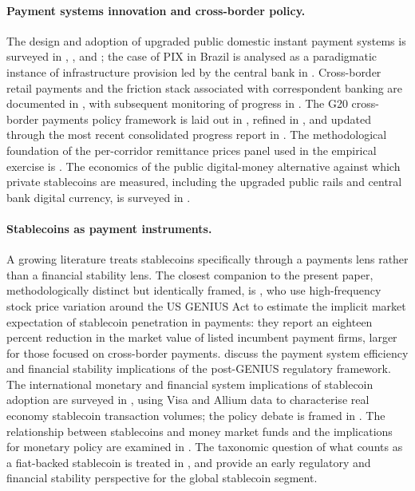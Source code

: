 \paragraph{Payment systems innovation and cross-border policy.} The design and adoption of upgraded public domestic instant payment systems is surveyed in \citet{bech_shimizu_wong_2017}, \citet{boar_etal_2020}, and \citet{frost_etal_2024_fast_payments}; the case of PIX in Brazil is analysed as a paradigmatic instance of infrastructure provision led by the central bank in \citet{duarte_etal_2022_pix}. Cross-border retail payments and the friction stack associated with correspondent banking are documented in \citet{cpmi_2018_cross_border_retail}, with subsequent monitoring of progress in \citet{cpmi_brief10_2024}. The G20 cross-border payments policy framework is laid out in \citet{fsb_2020_roadmap}, refined in \citet{fsb_2023_priority_actions}, and updated through the most recent consolidated progress report in \citet{fsb_2025_progress}. The methodological foundation of the per-corridor remittance prices panel used in the empirical exercise is \citet{beck_martinez_peria_2011}. The economics of the public digital-money alternative against which private stablecoins are measured, including the upgraded public rails and central bank digital currency, is surveyed in \citet{ahnert_etal_2024_economics_cbdc}.

\paragraph{Stablecoins as payment instruments.} A growing literature treats stablecoins specifically through a payments lens rather than a financial stability lens. The closest companion to the present paper, methodologically distinct but identically framed, is \citet{copestake_etal_2026}, who use high-frequency stock price variation around the US GENIUS Act to estimate the implicit market expectation of stablecoin penetration in payments: they report an eighteen percent reduction in the market value of listed incumbent payment firms, larger for those focused on cross-border payments. \citet{ahmed_clouse_etal_2025} discuss the payment system efficiency and financial stability implications of the post-GENIUS regulatory framework. The international monetary and financial system implications of stablecoin adoption are surveyed in \citet{aldasoro_frost_ito_2026}, using Visa and Allium data to characterise real economy stablecoin transaction volumes; the policy debate is framed in \citet{hernandez_de_cos_2026}. The relationship between stablecoins and money market funds and the implications for monetary policy are examined in \citet{bis_wp_1219}. The taxonomic question of what counts as a fiat-backed stablecoin is treated in \citet{bis_papers_141}, and \citet{adachi_etal_2020} provide an early regulatory and financial stability perspective for the global stablecoin segment.

